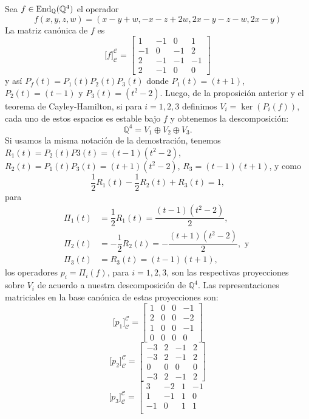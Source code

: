 \begin{ejem}
Sea $f\in\End_{\mathbb{Q}}(\mathbb{Q}^4)$ el operador
$$f(x,y,z,w)=(x-y+w,-x-z+2w,2x-y-z-w,2x-y)$$
La matriz canónica de $f$ es
$$\Big[f\Big]_\mathcal{C}^\mathcal{C}=\left[\begin{array}{rrrr}
1 & -1 & 0 & 1\\
-1 & 0 & -1 & 2\\
2 & -1 & -1 & -1\\
2 & -1 & 0 & 0
\end{array}\right]$$
y así $P_f(t)=P_1(t)P_2(t)P_3(t)$ donde $P_1(t)=(t+1)$, $P_2(t)=(t-1)$ y $P_3(t)=(t^2-2)$. Luego, de la proposición anterior y el teorema de Cayley-Hamilton, si para $i=1,2,3$ definimos $V_i=\ker(P_i(f))$, cada uno de estos espacios es estable bajo $f$ y obtenemos la descomposici\'on:
$$\mathbb{Q}^4=V_1\oplus V_2\oplus V_3.$$
Si usamos la misma notaci\'on de la demostraci\'on, tenemos $R_1(t)=P_2(t)P3(t)=(t-1)(t^2-2)$, $R_2(t)=P_1(t)P_3(t)=(t+1)(t^2-2)$, $R_3=(t-1)(t+1)$, y como
$$\dfrac{1}{2}R_1(t)-\dfrac{1}{2}R_2(t)+R_3(t)=1,$$
para
\begin{align*}
\Pi_1(t) & =\dfrac{1}{2}R_1(t)=\dfrac{(t-1)(t^2-2)}{2},\\
\Pi_2(t) & =-\dfrac{1}{2}R_2(t)=-\dfrac{(t+1)(t^2-2)}{2},\textrm{ y }\\
\Pi_3(t) & =R_3(t)=(t-1)(t+1),
\end{align*}
los operadores $p_i=\Pi_i(f)$, para $i=1,2,3$, son las respectivas proyecciones sobre $V_i$ de acuerdo a nuestra descomposici\'on de $\mathbb{Q}^4$. Las representaciones matriciales en la base can\'onica de estas proyecciones son:
$$\Big[ p_1\Big]_\mathcal{C}^\mathcal{C}=\left[\begin{array}{rrrr}
1 & 0 & 0 & -1\\
2 & 0 & 0 & -2\\
1 & 0 & 0 & -1\\
0 & 0 & 0 & 0
\end{array}\right]$$
$$\Big[ p_2\Big]_\mathcal{C}^\mathcal{C}=\left[\begin{array}{rrrr}
-3 & 2 & -1 & 2\\
-3 & 2 & -1 & 2\\
0 & 0 & 0 & 0\\
-3 & 2 & -1 & 2
\end{array}\right] $$
$$\Big[ p_3\Big]_\mathcal{C}^\mathcal{C}=\left[\begin{array}{rrrr}
3 & -2 & 1 & -1\\
1 & -1 & 1 & 0\\
-1 & 0 & 1 & 1\\

\end{array}$$
\end{ejem}
